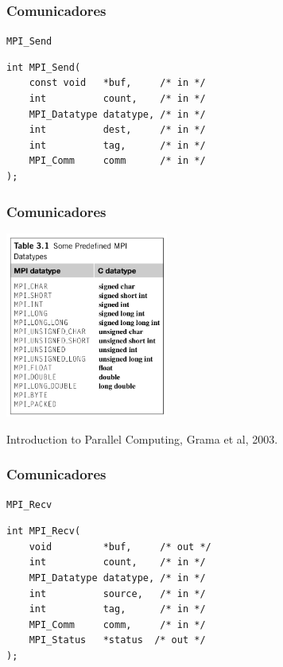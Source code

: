 \documentclass[xcolor={usenames,dvipsnames},12pt,presentation,aspectratio=169]{beamer}
\begin{document}
\begin{frame}[fragile]
  \frametitle{Comunicadores}
  \vspace{-2mm}
\begin{block}{\texttt{MPI_Send}}
  \begin{center}  
    \begin{minipage}{0.9\textwidth}
      \begin{verbatim}
int MPI_Send(
    const void   *buf,     /* in */
    int          count,    /* in */
    MPI_Datatype datatype, /* in */
    int          dest,     /* in */
    int          tag,      /* in */
    MPI_Comm     comm      /* in */
);
      \end{verbatim}
    \end{minipage}
    \end{center}
  \end{block}
\end{frame}
\begin{frame}
  \frametitle{Comunicadores}
  \vspace{-4mm}
  \begin{center}
	\includegraphics[width=0.4\textwidth]{datatype.png}
  \end{center}
  \vfill
  {\tiny Introduction to Parallel Computing, Grama et al, 2003.}
\end{frame}
\begin{frame}[fragile]
  \frametitle{Comunicadores}
  \vspace{-2mm}
\begin{block}{\texttt{MPI_Recv}}
  \begin{center}  
    \begin{minipage}{0.9\textwidth}
      \begin{verbatim}
int MPI_Recv(
    void         *buf,     /* out */
    int          count,    /* in */
    MPI_Datatype datatype, /* in */
    int          source,   /* in */
    int          tag,      /* in */
    MPI_Comm     comm,     /* in */
    MPI_Status   *status  /* out */
);
      \end{verbatim}
    \end{minipage}
    \end{center}
  \end{block}
\end{frame}
\end{document}
